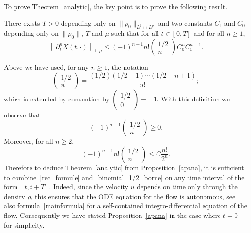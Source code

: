 \documentclass[10pt]{amsart}
\theoremstyle{definition}\newtheorem{defi}[theo]{Definition}\newtheorem{rema}[theo]{Remark}\newtheorem{exam}[theo]{Example}\newtheorem{exem}[theo]{Example}\newtheorem{nota}[theo]{Notation}
\renewcommand{\leq}{\leqslant}
\renewcommand{\geq}{\geqslant}
\begin{document}
To prove Theorem~\ref{analytic}, the key point is to prove the following result.

\begin{prop}\label{apana}
There exists $T>0$ depending only on $\|\rho_0\|_{L^1\, \cap\, L^p}$ and two constants $C_1 $ and $C_0$ depending only on $\|\rho_0\|$, $T$ and $\mu$ such that for all $t\in[0,T]$ and for all $n\geq1$,
\begin{equation}\label{rec_formule}
\left\|\partial_t^{n} X(t,\cdot)\right\|_{1,\mu} \leq (-1)^{n-1} n!
\begin{pmatrix}
1/2 \\ n
\end{pmatrix}
C_0^n C_1^{n-1}.
\end{equation}
\end{prop}

Above we have used, for any $n\geq 1$, the notation
\begin{equation}\label{binomial_1/2}
\begin{pmatrix}
1/2\\
n
\end{pmatrix}= \frac{(1/2)(1/2-1) \cdots (1/2-n+1)}{n!};
\end{equation}
which is extended by convention by $
(\begin{smallmatrix}
1/2\\0
\end{smallmatrix})=-1$. With this definition we observe that
\[
(-1)^{n-1}
\begin{pmatrix}
1/2\\n
\end{pmatrix}\geq 0.
\]
Moreover, for all $n\geq 2$,
\begin{equation}\label{binomial_1/2_borne}
(-1)^{n-1} n!
\begin{pmatrix}
1/2\\n
\end{pmatrix} \leq C \frac{n!}{2^n}.
\end{equation}
Therefore to deduce Theorem~\ref{analytic} from Proposition~\ref{apana}, it is sufficient to combine~\eqref{rec_formule} and~\eqref{binomial_1/2_borne} on any time interval of the form $[t,t+T] $. Indeed, since the velocity $u$ depends on time only through the density $\rho$, this ensures that the ODE equation for the flow is autonomous, see also formula~\eqref{mainformula} for a self-contained integro-differential equation of the flow. Consequently we have stated Proposition~\ref{apana} in the case where $t=0$ for simplicity.
\end{document}
